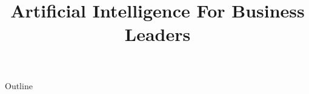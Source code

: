 \documentclass[xcolor=dvipsnames,compress,t,pdf,notes,9pt]{beamer}
\title[\insertframenumber /\inserttotalframenumber]{Artificial Intelligence For Business Leaders}
\begin{document}
	\begin{frame}
	\titlepage
	\end{frame}
	
	\begin{frame}{Outline}
	    \tableofcontents
	\end{frame}

	
	
	
\end{document}
